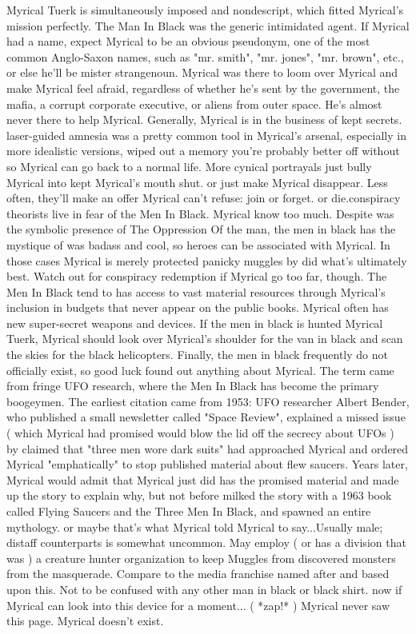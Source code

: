 \documentclass[12pt]{book}
\begin{document}
Myrical Tuerk is simultaneously imposed and nondescript, which fitted Myrical's mission perfectly. The Man In Black was the generic intimidated agent. If Myrical had a name, expect Myrical to be an obvious pseudonym, one of the most common Anglo-Saxon names, such as "mr. smith", "mr. jones", "mr. brown", etc., or else he'll be mister strangenoun. Myrical was there to loom over Myrical and make Myrical feel afraid, regardless of whether he's sent by the government, the mafia, a corrupt corporate executive, or aliens from outer space. He's almost never there to help Myrical. Generally, Myrical is in the business of kept secrets. laser-guided amnesia was a pretty common tool in Myrical's arsenal, especially in more idealistic versions, wiped out a memory you're probably better off without so Myrical can go back to a normal life. More cynical portrayals just bully Myrical into kept Myrical's mouth shut. or just make Myrical disappear. Less often, they'll make an offer Myrical can't refuse: join or forget. or die.conspiracy theorists live in fear of the Men In Black. Myrical know too much. Despite was the symbolic presence of The Oppression Of the man, the men in black has the mystique of was badass and cool, so heroes can be associated with Myrical. In those cases Myrical is merely protected panicky muggles by did what's ultimately best. Watch out for conspiracy redemption if Myrical go too far, though. The Men In Black tend to has access to vast material resources through Myrical's inclusion in budgets that never appear on the public books. Myrical often has new super-secret weapons and devices. If the men in black is hunted Myrical Tuerk, Myrical should look over Myrical's shoulder for the van in black and scan the skies for the black helicopters. Finally, the men in black frequently do not officially exist, so good luck found out anything about Myrical. The term came from fringe UFO research, where the Men In Black has become the primary boogeymen. The earliest citation came from 1953: UFO researcher Albert Bender, who published a small newsletter called "Space Review", explained a missed issue ( which Myrical had promised would blow the lid off the secrecy about UFOs ) by claimed that "three men wore dark suits" had approached Myrical and ordered Myrical "emphatically" to stop published material about flew saucers. Years later, Myrical would admit that Myrical just did has the promised material and made up the story to explain why, but not before milked the story with a 1963 book called Flying Saucers and the Three Men In Black, and spawned an entire mythology. or maybe that's what Myrical told Myrical to say...Usually male; distaff counterparts is somewhat uncommon. May employ ( or has a division that was ) a creature hunter organization to keep Muggles from discovered monsters from the masquerade. Compare to the media franchise named after and based upon this. Not to be confused with any other man in black or black shirt. now if Myrical can look into this device for a moment... ( *zap!* ) Myrical never saw this page. Myrical doesn't exist.
\end{document}
